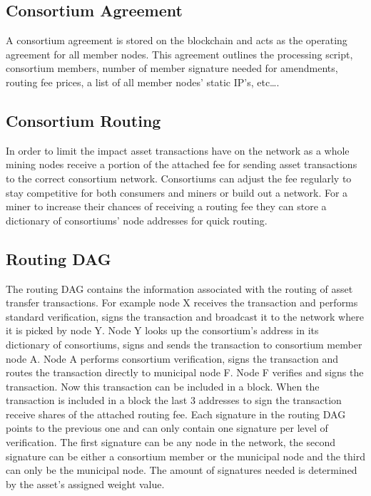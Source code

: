 \documentclass[12pt]{article}
\begin{document}
\subsection{Consortium Agreement}

A consortium agreement is stored 
on the blockchain and acts as the operating agreement for all member nodes. 
This agreement outlines the processing script, consortium 
members, number of member signature needed for amendments, routing fee prices, a 
list of all member nodes' static IP’s, etc….

\subsection{Consortium Routing}


In order to limit the impact asset transactions have on the network as a whole mining 
nodes receive a portion of the attached fee for sending asset transactions to the correct
consortium network.  Consortiums can adjust the fee regularly to stay competitive for both
consumers and miners or build out a network. 
For a miner to 
increase their chances of receiving a routing fee they can store a dictionary 
of consortiums' node addresses for quick routing.



\subsection{Routing DAG}


The routing DAG contains the information associated with the routing of asset 
transfer transactions.  For example node X receives the transaction and performs standard 
verification, signs the transaction and broadcast it to the network where it is picked
by node Y. Node Y looks up the consortium's address in its dictionary of 
consortiums, signs and sends the transaction to consortium member node A. Node A performs 
consortium verification, signs the transaction and routes the transaction directly to 
municipal node F.  Node F verifies and signs the transaction. 
Now this transaction can be included in a block.  When the 
transaction is included in a block the last 3 addresses to sign the transaction 
receive shares of the attached routing fee.  Each signature in the routing DAG points 
to the previous one and can only contain one signature per level of verification.  
The first signature can be any node in the network, 
the second signature can be either a consortium member or the municipal node 
and the third can only be the municipal node.  The amount of signatures needed 
is determined by the asset's assigned weight value. 
\end{document}

